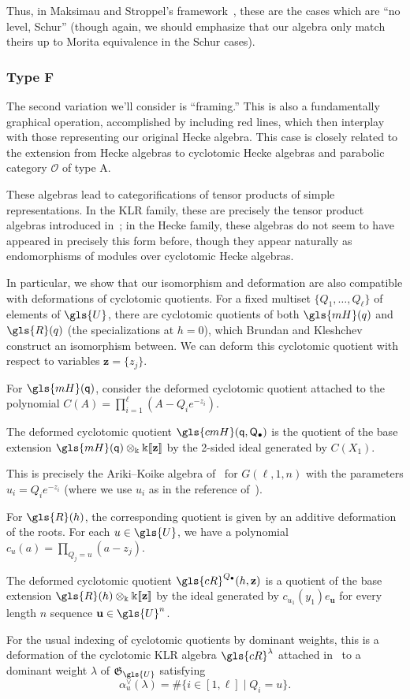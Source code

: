 \documentclass[ALCO,ThmDefs,Unicode,epreuves]{cedram}
\newcommand{\Bz}{\mathbf{z}}
\newcommand{\pq}{\mathsf{q}}
\newcommand{\K}{\Bbbk}%
\newcommand{\la}{\lambda}
\newcommand{\PQ}{\mathsf{Q}}
\newcommand{\Bu}{\mathbf{u}}
\newcommand{\al}{\alpha}
\newcommand{\cO}{\mathcal{O}}
\newcommand\llbracket{[\![}
\newcommand\rrbracket{]\!]}
\begin{document}
 Thus, in Maksimau and Stroppel's framework~\cite{MS18}, these are the cases which are
 ``no level, Schur'' (though again, we should emphasize that our
 algebra only match theirs up to Morita equivalence in the Schur
 cases). 

\subsubsection*{Type F}
The second variation we'll consider is ``framing.'' This is also a
fundamentally graphical operation, accomplished by including red lines, which
then interplay with those representing our original Hecke algebra.
This case is closely related to the extension from Hecke algebras to
cyclotomic Hecke algebras and parabolic category $\cO$ of type A.

These algebras lead to categorifications of tensor products of simple
representations. 
In the KLR family, these are precisely the tensor
product algebras introduced in~\cite[Def.~4.7]{Webmerged}; in the Hecke family,
these algebras do not seem to have appeared in precisely this form
before, though they appear naturally as endomorphisms of modules
over cyclotomic Hecke algebras.

In particular, we show that our isomorphism and deformation are also compatible with
 deformations of cyclotomic quotients. 
For a fixed multiset $\{Q_1,\dots, Q_\ell\}$ of elements of $\gls{U}$, there are cyclotomic quotients of both
 $\gls{mH}(q)$ and $\gls{R}(q)$ (the specializations at $h=0$), which Brundan and Kleshchev construct an
 isomorphism between. We can deform this cyclotomic quotient with
 respect to variables $\mathbf{z}=\{z_{j}\}$.

For $\gls{mH}(\pq)$, consider the
deformed cyclotomic quotient attached to the 
polynomial 
\mbox{$C(A)= \prod_{i=1}^\ell
(A-Q_ie^{-z_i}).$} 
\begin{defi}\label{def:cmH}
 The deformed cyclotomic quotient $\gls{cmH}(\pq,\PQ_\bullet)$ is the quotient
 of the base extension $\gls{mH}(\pq)\otimes_\K\K\llbracket \mathbf{z}\rrbracket $ by the
 2-sided ideal generated by $C(X_1)$.
\end{defi}
This is precisely the Ariki--Koike algebra of~\cite[Def.~3.1]{AK} for
$G(\ell,1,n)$ with the parameters $u_i=Q_ie^{-z_i}$ (where we use $u_i$ as in the reference
of~\cite{AK}).


For $\gls{R}(h)$, the corresponding quotient is given by an additive
deformation of the roots. For each $u\in \gls{U}$, we have a
polynomial $c_u(a)=\prod_{Q_j=u}(a-z_{j})$.
\begin{defi}\label{def:cR}
 The deformed cyclotomic quotient $\gls{cR}^{Q_\bullet}(h,\Bz)$ is a quotient of
 the base extension $\gls{R}(h)\otimes_\K\K\llbracket \mathbf{z}\rrbracket $ by the ideal
 generated by $c_{u_1}(y_1)e_\Bu$ for every length $n$ sequence
 $\Bu\in \gls{U}^n$.
\end{defi}
For the usual indexing of cyclotomic quotients by dominant weights,
this is a deformation of the cyclotomic KLR algebra $\gls{cR}^\la$ attached in~\cite{KLI} to a
dominant weight $\la$ of $\mathfrak{G}_{\gls{U}}$ satisfying
\[\al_u^\vee(\la)=\#\{i\in [1,\ell]\mid Q_i=u\}.\]
\end{document}
